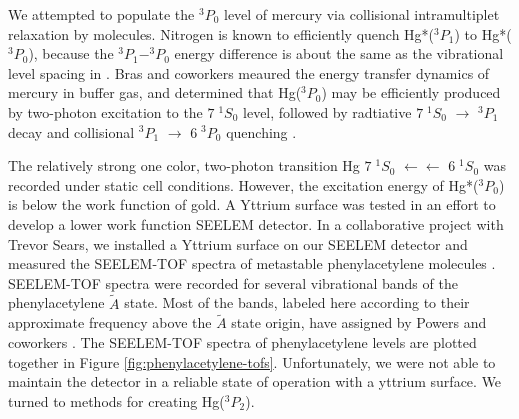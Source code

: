 \documentclass[12pt]{mitthesis}
\begin{document}
We attempted to populate the $^3P_0$ level of mercury via collisional
intramultiplet relaxation by  molecules.  Nitrogen is known to
efficiently quench Hg*($^3P_1$) to Hg*($^3P_0$), because the
$^3P_1-^3P_0$ energy difference is about the same as the vibrational
level spacing in  \cite{callear70, horiguchi71, mitchell61}.
Bras and coworkers meaured the energy transfer dynamics of mercury in
 buffer gas, and determined that Hg($^3P_0$) may be efficiently
produced by two-photon excitation to the $7 \; ^1S_0$ level, followed
by radtiative $7 \; ^1S_0$ $\rightarrow$ $^3P_1$ decay and collisional
$^3P_1$ $\rightarrow$ $6 \; ^3P_0$ quenching \cite{bras93}.

The relatively strong one color, two-photon transition Hg $7 \; ^1S_0$
$\leftarrow\leftarrow$ $6 \; ^1S_0$ was recorded under static cell
conditions.  However, the excitation energy of Hg*($^3P_0$) is below
the work function of gold.  A Yttrium surface was tested in an effort
to develop a lower work function SEELEM detector.  In a collaborative
project with Trevor Sears, we installed a Yttrium surface on our
SEELEM detector and measured the SEELEM-TOF spectra of metastable
phenylacetylene molecules \cite{hofstein08}.  SEELEM-TOF spectra were
recorded for several vibrational bands of the phenylacetylene
$\tilde{A}$ state.  Most of the bands, labeled here according to their
approximate frequency above the $\tilde{A}$ state origin, have
assigned by Powers and coworkers \cite{powers81}.  The SEELEM-TOF
spectra of phenylacetylene levels are plotted together in Figure
\ref{fig:phenylacetylene-tofs}.  Unfortunately, we were not able to
maintain the detector in a reliable state of operation with a yttrium
surface.  We turned to methods for creating Hg($^3P_2$).
\end{document}
